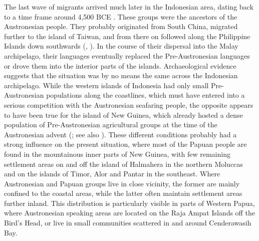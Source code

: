 The last wave of migrants arrived much later in the Indonesian area, dating back to a time frame around 4,500 BCE \citep{Bellwood1998, Bellwood2007}. These groups were the ancestors of the Austronesian people. They probably originated from South China, migrated further to the island of Taiwan, and from there on followed along the Philippine Islands down southwards (\citealt{Tryon1995}, \citealt{capelli2001}). In the course of their dispersal into the Malay archipelago, their languages eventually replaced the Pre-Austronesian languages or drove them into the interior parts of the islands. Archaeological evidence suggests that the situation was by no means the same across the Indonesian archipelago. While the western islands of Indonesia had only small Pre-Austronesian populations along the coastlines, which must have entered into a serious competition with the Austronesian seafaring people, the opposite appears to have been true for the island of New Guinea, which already hosted a dense population of Pre-Austronesian agricultural groups at the time of the Austronesian advent (\citealt{Bellwood1998}; see also \citealt{Ross2005}). These different conditions probably had a strong influence on the present situation, where most of the Papuan people are found in the mountainous inner parts of New Guinea, with few remaining settlement areas on and off the island of Halmahera in the northern Moluccas and on the islands of Timor, Alor and Pantar in the southeast. Where Austronesian and Papuan groups live in close vicinity, the former are mainly confined to the coastal areas, while the latter often maintain settlement areas further inland. This distribution is particularly visible in parts of Western Papua, where Austronesian speaking areas are located on the Raja Ampat Islands off the Bird's Head, or live in small communities scattered in and around Cenderawasih Bay.

